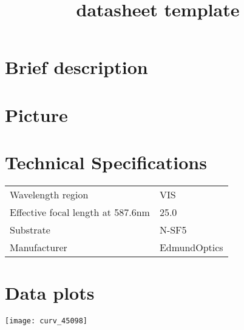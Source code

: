 \documentclass{article}
\title{\vspace{-4cm}datasheet template}
\date{}
\begin{document}
\maketitle

\vspace{-1cm}

\begin{multicols}{2}

\section{Brief description}



\section{Picture}

\section{Technical Specifications}

\begin{tabular}{|l|l|}
Wavelength region & VIS \\
Effective focal length at 587.6nm & 25.0 \\
Substrate & N-SF5 \\
Manufacturer & EdmundOptics \\
\end{tabular}%

\section{Data plots} 

\begin{center}
\texttt{[image: curv\_45098]}
\end{center}


\end{multicols}
\end{document}
